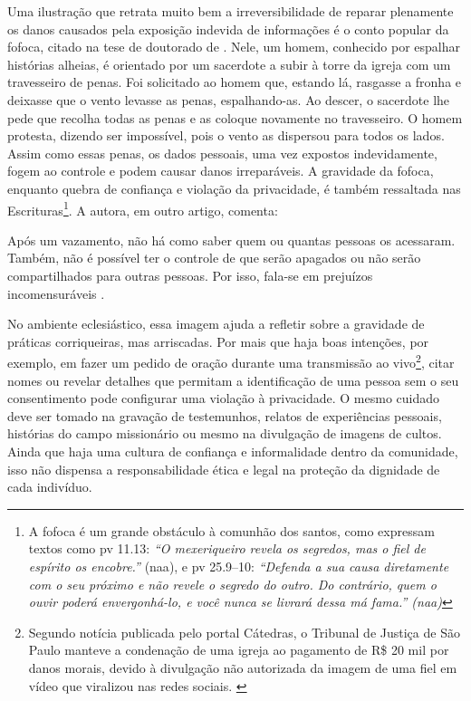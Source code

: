 Uma ilustração que retrata muito bem a irreversibilidade de reparar plenamente os danos causados pela exposição indevida de informações é o conto popular da fofoca, citado na tese de doutorado de . Nele, um homem, conhecido por espalhar histórias alheias, é orientado por um sacerdote a subir à torre da igreja com um travesseiro de penas. Foi solicitado ao homem que, estando lá, rasgasse a fronha e deixasse que o vento levasse as penas, espalhando-as. Ao descer, o sacerdote lhe pede que recolha todas as penas e as coloque novamente no travesseiro. O homem protesta, dizendo ser impossível, pois o vento as dispersou para todos os lados. Assim como essas penas, os dados pessoais, uma vez expostos indevidamente, fogem ao controle e podem causar danos irreparáveis. A gravidade da fofoca, enquanto quebra de confiança e violação da privacidade, é também ressaltada nas Escrituras\footnote{A fofoca é um grande obstáculo à comunhão dos santos, como expressam textos como \gls{pv} 11.13: \textit{``O mexeriqueiro revela os segredos, mas o fiel de espírito os encobre.''} (\gls{naa}), e \gls{pv} 25.9–10: \textit{``Defenda a sua causa diretamente com o seu próximo e não revele o segredo do outro. Do contrário, quem o ouvir poderá envergonhá-lo, e você nunca se livrará dessa má fama.'' (\gls{naa})}}. A autora, em outro artigo, comenta:

\begin{citacao}
    Após um vazamento, não há como saber quem ou quantas pessoas os acessaram. Também, não é possível ter o controle de que serão apagados ou não serão compartilhados para outras pessoas. Por isso, fala-se em prejuízos incomensuráveis \cite{migalhas2023}.
\end{citacao}

No ambiente eclesiástico, essa imagem ajuda a refletir sobre a gravidade de práticas corriqueiras, mas arriscadas. Por mais que haja boas intenções, por exemplo, em fazer um pedido de oração durante uma transmissão ao vivo\footnote{Segundo notícia publicada pelo portal Cátedras, o Tribunal de Justiça de São Paulo manteve a condenação de uma igreja ao pagamento de R\$ 20 mil por danos morais, devido à divulgação não autorizada da imagem de uma fiel em vídeo que viralizou nas redes sociais. \cite{catedras2024}}, citar nomes ou revelar detalhes que permitam a identificação de uma pessoa sem o seu consentimento pode configurar uma violação à privacidade. O mesmo cuidado deve ser tomado na gravação de testemunhos, relatos de experiências pessoais, histórias do campo missionário ou mesmo na divulgação de imagens de cultos. Ainda que haja uma cultura de confiança e informalidade dentro da comunidade, isso não dispensa a responsabilidade ética e legal na proteção da dignidade de cada indivíduo.

